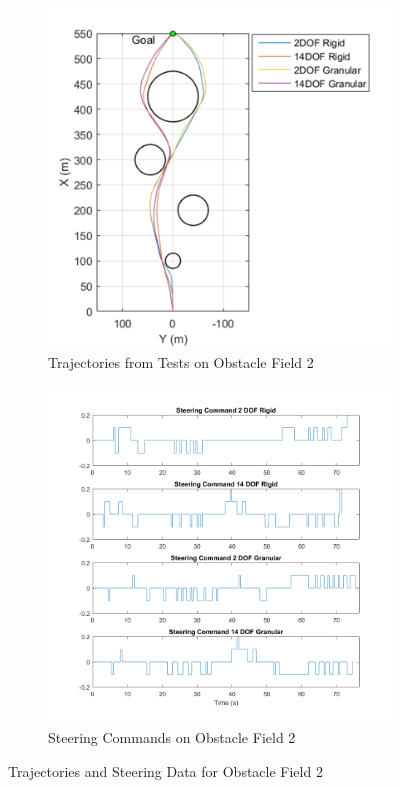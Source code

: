 \documentclass[12pt,twocolumn]{article}
\begin{document}
\begin{figure}
	\centering
	\begin{subfigure}[b]{\columnwidth}
		\centering
		\includegraphics[width=\columnwidth]{Figs/ObstacleField2Trajectories.png}
		\caption{{\small Trajectories from Tests on Obstacle Field 2}}   
		\label{fig:ObstacleField2Trajectories}
	\end{subfigure}
	\hfill
	\begin{subfigure}[b]{\columnwidth}
		\centering
		\includegraphics[width=\columnwidth]{Figs/SteeringCommandsField2.png}
		\caption{\small Steering Commands on Obstacle Field 2}   
		\label{fig:SteeringCommandsField2}
	\end{subfigure}
	\caption{\small Trajectories and Steering Data for Obstacle Field 2}
	\label{fig:Obst2TestData}
\end{figure}
\end{document}
